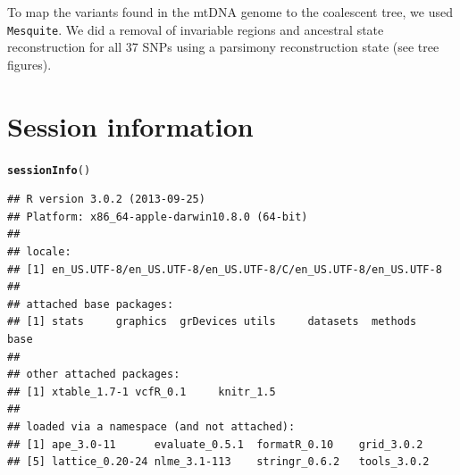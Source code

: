 \documentclass{article}\usepackage[]{graphicx}\usepackage[]{color}
\makeatletter
\newcommand{\hlstd}[1]{\textcolor[rgb]{0.345,0.345,0.345}{#1}}%
\newcommand{\hlkwd}[1]{\textcolor[rgb]{0.737,0.353,0.396}{\textbf{#1}}}%
\newenvironment{kframe}{%
 \def\at@end@of@kframe{}%
 \ifinner\ifhmode%
  \def\at@end@of@kframe{\end{minipage}}%
  \begin{minipage}{\columnwidth}%
 \fi\fi%
 \def\FrameCommand##1{\hskip\@totalleftmargin \hskip-\fboxsep
 \colorbox{shadecolor}{##1}\hskip-\fboxsep
     \hskip-\linewidth \hskip-\@totalleftmargin \hskip\columnwidth}%
 \MakeFramed {\advance\hsize-\width
   \@totalleftmargin\z@ \linewidth\hsize
   \@setminipage}}%
 {\par\unskip\endMakeFramed%
 \at@end@of@kframe}
\newenvironment{knitrout}{}{} %
\makeatother
\begin{document}
To map the variants found in the mtDNA genome to the coalescent tree, we used \texttt{Mesquite}. We did a removal of invariable regions and ancestral state reconstruction for all 37 SNPs using a parsimony reconstruction state (see tree figures).

\newpage






\vspace{24pt}


\section{Session information}

\begin{knitrout}
\color{fgcolor}\begin{kframe}
\begin{alltt}
\hlkwd{sessionInfo}\hlstd{()}
\end{alltt}
\begin{verbatim}
## R version 3.0.2 (2013-09-25)
## Platform: x86_64-apple-darwin10.8.0 (64-bit)
## 
## locale:
## [1] en_US.UTF-8/en_US.UTF-8/en_US.UTF-8/C/en_US.UTF-8/en_US.UTF-8
## 
## attached base packages:
## [1] stats     graphics  grDevices utils     datasets  methods   base     
## 
## other attached packages:
## [1] xtable_1.7-1 vcfR_0.1     knitr_1.5   
## 
## loaded via a namespace (and not attached):
## [1] ape_3.0-11      evaluate_0.5.1  formatR_0.10    grid_3.0.2     
## [5] lattice_0.20-24 nlme_3.1-113    stringr_0.6.2   tools_3.0.2
\end{verbatim}
\end{kframe}
\end{knitrout}






\end{document}
